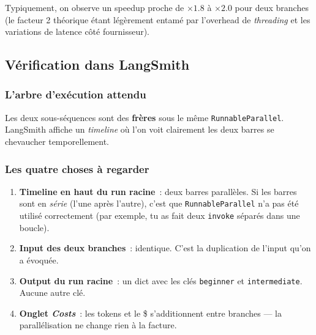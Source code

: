 \documentclass[11pt,a4paper]{article}
\begin{document}
Typiquement, on observe un speedup proche de $\times 1.8$ à $\times 2.0$
pour deux branches (le facteur 2 théorique étant légèrement entamé par
l'overhead de \emph{threading} et les variations de latence côté
fournisseur).

\subsection{Vérification dans LangSmith}

\subsubsection*{L'arbre d'exécution attendu}

\begin{center}
\end{center}

Les deux sous-séquences sont des \textbf{frères} sous le même
\texttt{RunnableParallel}. LangSmith affiche un \emph{timeline} où l'on
voit clairement les deux barres se chevaucher temporellement.

\subsubsection*{Les quatre choses à regarder}

\begin{enumerate}[leftmargin=*]
  \item \textbf{Timeline en haut du run racine}~: deux barres parallèles.
        Si les barres sont en \emph{série} (l'une après l'autre), c'est
        que \texttt{RunnableParallel} n'a pas été utilisé correctement
        (par exemple, tu as fait deux \texttt{invoke} séparés dans une
        boucle).
  \item \textbf{Input des deux branches}~: identique. C'est la duplication
        de l'input qu'on a évoquée.
  \item \textbf{Output du run racine}~: un dict avec les clés
        \texttt{beginner} et \texttt{intermediate}. Aucune autre clé.
  \item \textbf{Onglet \emph{Costs}}~: les tokens et le \$ s'additionnent
        entre branches — la parallélisation ne change rien à la facture.
\end{enumerate}
\end{document}
